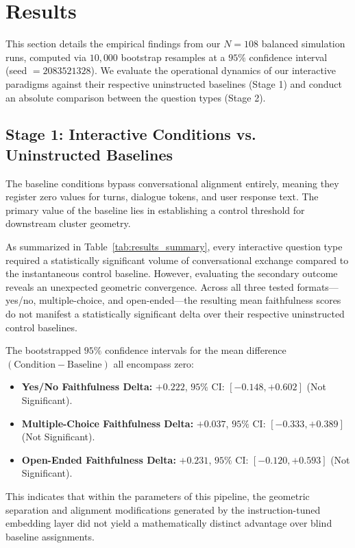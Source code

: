 \section{Results}
\label{sec:results}

This section details the empirical findings from our $N=108$ balanced simulation runs, computed via $10,000$ bootstrap resamples at a $95\%$ confidence interval (seed $= 2083521328$).
We evaluate the operational dynamics of our interactive paradigms against their respective uninstructed baselines (Stage 1) and conduct an absolute comparison between the question types (Stage 2).

\subsection{Stage 1: Interactive Conditions vs. Uninstructed Baselines}
The baseline conditions bypass conversational alignment entirely, meaning they register zero values for turns, dialogue tokens, and user response text. 
The primary value of the baseline lies in establishing a control threshold for downstream cluster geometry.

As summarized in Table~\ref{tab:results_summary}, every interactive question type required a statistically significant volume of conversational exchange compared to the instantaneous control baseline.
However, evaluating the secondary outcome reveals an unexpected geometric convergence.
Across all three tested formats—yes/no, multiple-choice, and open-ended—the resulting mean faithfulness scores do not manifest a statistically significant delta over their respective uninstructed control baselines. 

The bootstrapped $95\%$ confidence intervals for the mean difference $(\text{Condition} - \text{Baseline})$ all encompass zero:
\begin{itemize}
    \item \textbf{Yes/No Faithfulness Delta:} 
    $+0.222$, $95\%$ CI: $[-0.148, +0.602]$ (Not Significant).
    \item \textbf{Multiple-Choice Faithfulness Delta:}
    $+0.037$, $95\%$ CI: $[-0.333, +0.389]$ (Not Significant).
    \item \textbf{Open-Ended Faithfulness Delta:}
    $+0.231$, $95\%$ CI: $[-0.120, +0.593]$ (Not Significant).
\end{itemize}
This indicates that within the parameters of this pipeline, the geometric separation and alignment modifications generated by the instruction-tuned embedding layer did not yield a mathematically distinct advantage over blind baseline assignments. 

